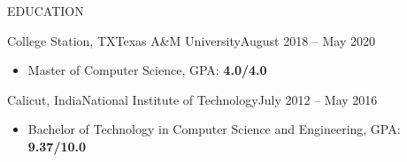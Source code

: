 \documentclass[]{mcdowellcv}
\begin{document}
	\begin{cvsection}{EDUCATION}
		\begin{cvsubsection}{College Station, TX}{Texas A\&M University}{August 2018 -- May 2020}
			\begin{itemize}
				\item Master of Computer Science, GPA: \textbf{4.0/4.0}
			\end{itemize}
		\end{cvsubsection}
		
		\begin{cvsubsection}{Calicut, India}{National Institute of Technology}{July 2012 -- May 2016}
			\begin{itemize}
				\item Bachelor of Technology in Computer Science and Engineering, GPA: \textbf{9.37/10.0}
			\end{itemize}
		\end{cvsubsection}
	\end{cvsection}
\end{document}

